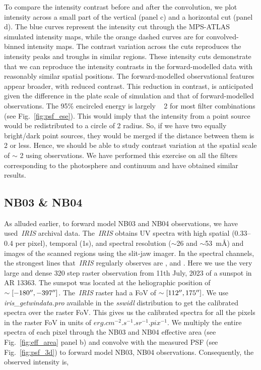 To compare the intensity contrast before and after the convolution, we plot intensity across a small part of the vertical (panel c) and a horizontal cut (panel d). The blue curves represent the intensity cut through the MPS-ATLAS simulated intensity maps, while the orange dashed curves are for convolved-binned intensity maps. The contrast variation across the cuts reproduces the intensity peaks and troughs in similar regions. These intensity cuts demonstrate that we can reproduce the intensity contrasts in the forward-modelled data with reasonably similar spatial positions. The forward-modelled observational features appear broader, with reduced contrast. This reduction in contrast, is anticipated given the difference in the plate scale of simulation and that of forward-modelled observations. The 95\% encircled energy is largely ~ 2{\arcsec} for most filter combinations (see Fig.~\ref{fig:psf_ese}). This would imply that the intensity from a point source would be redistributed to a circle of 2{\arcsec} radius. So, if we have two equally bright/dark point sources, they would be merged if the distance between them is 2{\arcsec} or less. Hence, we should be able to study contrast variation at the spatial scale of $\sim$ 2{\arcsec} using {\suit} observations. We have performed this exercise on all the filters corresponding to the photosphere and continuum and have obtained similar results.

\subsection{NB03 \& NB04}\label{sec:nb3_contrast}

As alluded earlier, to forward model NB03 and NB04 observations, we have used~{\it IRIS} archival data. The~{\it IRIS} obtains UV spectra with high spatial (0.33{--}0.4{\arcsec} per pixel), temporal (1s), and spectral resolution ($\sim$26 and $\sim$53~m{\AA}) and images of the scanned regions using the slit-jaw imager. In the spectral channels, the strongest lines that~{\it IRIS} regularly observes are ,  and . Here we use the very large and dense 320 step raster observation from 11th July, 2023 of a sunspot in AR 13363. The sunspot was located at the heliographic position of $\sim [-180\hbox{$^{\prime\prime}$},-397\hbox{$^{\prime\prime}$}]$. The~{\it IRIS} raster had a FoV of $\sim [112\hbox{$^{\prime\prime}$},175\hbox{$^{\prime\prime}$}]$. We use \textit{iris\_getwindata.pro} available in the \textit{sswidl} distribution to get the calibrated spectra over the raster FoV. This gives us the calibrated spectra for all the pixels in the raster FoV in units of $erg.cm^{-2}.s^{-1}.sr^{-1}.pix^{-1}$. We multiply the entire spectra of each pixel through the NB03 and NB04 effective area (see            
Fig.~\ref{fig:eff_area} panel b) and convolve with the measured PSF (see            Fig.~\ref{fig:psf_3d}) to forward model NB03, NB04 observations. Consequently, the observed intensity is, 

